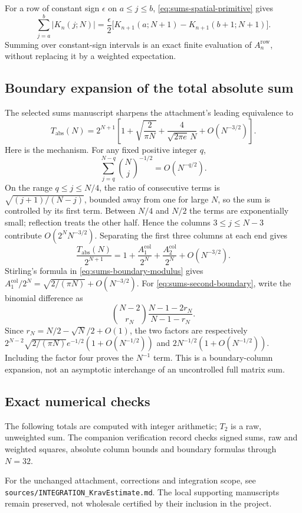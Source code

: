 For a row of constant sign $\epsilon$ on $a\le j\le b$, \eqref{eq:sums-spatial-primitive} gives
\[
\sum_{j=a}^b|K_n(j;N)|=\frac\epsilon2
\bigl[K_{n+1}(a;N+1)-K_{n+1}(b+1;N+1)\bigr].
\]
Summing over constant-sign intervals is an exact finite evaluation of $A_n^{\mathrm{row}}$, without replacing it by a weighted expectation.

\subsection{Boundary expansion of the total absolute sum}
The selected sums manuscript sharpens the attachment's leading equivalence to
\begin{equation}\label{eq:sums-absolute-asymptotic}
T_{\mathrm{abs}}(N)=2^{N+1}\left[
1+\sqrt{\frac2{\pi N}}+\frac4{\sqrt{2\pi e}\,N}+O(N^{-3/2})\right].
\end{equation}
Here is the mechanism. For any fixed positive integer $q$,
\[
\sum_{j=q}^{N-q}\binom Nj^{-1/2}=O(N^{-q/2}).
\]
On the range $q\le j\le N/4$, the ratio of consecutive terms is $\sqrt{(j+1)/(N-j)}$, bounded away from one for large $N$, so the sum is controlled by its first term. Between $N/4$ and $N/2$ the terms are exponentially small; reflection treats the other half. Hence the columns $3\le j\le N-3$ contribute $O(2^NN^{-3/2})$. Separating the first three columns at each end gives
\[
\frac{T_{\mathrm{abs}}(N)}{2^{N+1}}
=1+\frac{A_1^{\mathrm{col}}}{2^N}+\frac{A_2^{\mathrm{col}}}{2^N}+O(N^{-3/2}).
\]
Stirling's formula in \eqref{eq:sums-boundary-modulus} gives $A_1^{\mathrm{col}}/2^N=\sqrt{2/(\pi N)}+O(N^{-3/2})$.
For \eqref{eq:sums-second-boundary}, write the binomial difference as
\[
\binom{N-2}{r_N}\frac{N-1-2r_N}{N-1-r_N}.
\]
Since $r_N=N/2-\sqrt N/2+O(1)$, the two factors are respectively
$2^{N-2}\sqrt{2/(\pi N)}e^{-1/2}(1+O(N^{-1/2}))$ and
$2N^{-1/2}(1+O(N^{-1/2}))$. Including the factor four proves the $N^{-1}$ term. This is a boundary-column expansion, not an asymptotic interchange of an uncontrolled full matrix sum.

\subsection{Exact numerical checks}
The following totals are computed with integer arithmetic; $T_2$ is a raw, unweighted sum. The companion verification record checks signed sums, raw and weighted squares, absolute column bounds and boundary formulas through $N=32$.

For the unchanged attachment, corrections and integration scope, see \texttt{sources/INTEGRATION\_KravEstimate.md}. The local supporting manuscripts remain preserved, not wholesale certified by their inclusion in the project.
